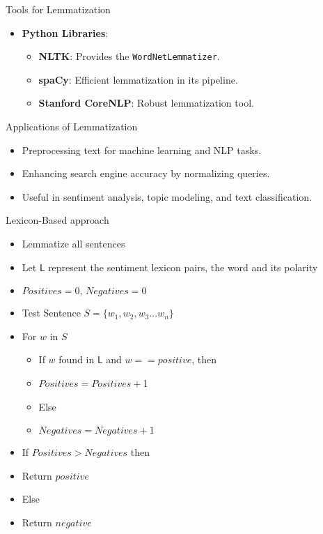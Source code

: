 \begin{frame}{Tools for Lemmatization}
	\begin{itemize}
		\item \textbf{Python Libraries}:
		\begin{itemize}
			\item \textbf{NLTK}: Provides the \texttt{WordNetLemmatizer}.
			\item \textbf{spaCy}: Efficient lemmatization in its pipeline.
			\item \textbf{Stanford CoreNLP}: Robust lemmatization tool.
		\end{itemize}
	\end{itemize}
\end{frame}


\begin{frame}{Applications of Lemmatization}
	\begin{itemize}
		\item Preprocessing text for machine learning and NLP tasks.
		\item Enhancing search engine accuracy by normalizing queries.
		\item Useful in sentiment analysis, topic modeling, and text classification.
	\end{itemize}
\end{frame}

\begin{frame}{Lexicon-Based approach}

\begin{itemize}
\item [] Lemmatize all sentences
\item [] Let $\mathsf{L}$ represent the sentiment lexicon pairs, the word and its polarity
\item[] $Positives = 0, \, Negatives =0$
\item[] Test Sentence $S =\{w_1,w_2,w_3...w_n\}$
\item[] For $w$ in $S$
\begin{itemize}
\item []   If $w$ found in $\mathsf{L}$ and $w == positive$, then
	\item[] \quad\quad$Positives = Positives +$1
     \item[] Else
	\item[] \quad\quad$Negatives = Negatives +1$
\end{itemize}
\item[] If $Positives > Negatives$ then
     \item[] \quad\quad Return $positive$
    \item [] Else
    \item[] \quad\quad Return $negative$
\end{itemize}

\end{frame}